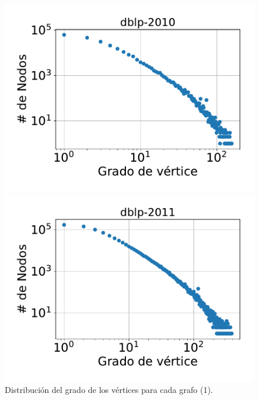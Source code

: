 \begin{frame}
\begin{figure}
    	\begin{minipage}{1\textwidth}
    		\centering
    		\begin{minipage}{0.45\textwidth}
    			\centering
    			\includegraphics[width=1\linewidth]{../img/grades/dblp-2010.pdf}
    		\end{minipage}
    		\begin{minipage}{0.45\textwidth}
    			\centering
    			\includegraphics[width=1\linewidth]{../img/grades/dblp-2011.pdf}
    		\end{minipage}  
    	\end{minipage}	

    \caption{Distribución del grado de los vértices para cada grafo (1).}
\end{figure}


\end{frame}
